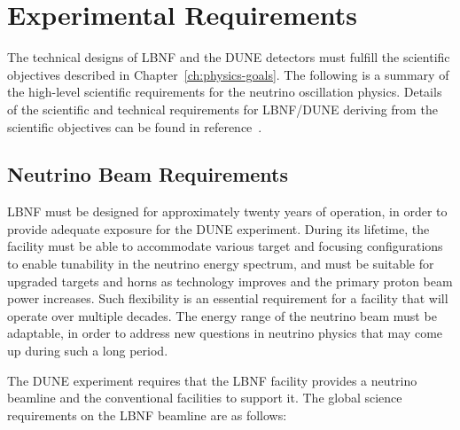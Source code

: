 \section{Experimental Requirements}
\label{sec:physics-lbnosc-det-req}

The technical designs of LBNF and the DUNE detectors must fulfill the
scientific objectives described in Chapter~\ref{ch:physics-goals}. The
following is a summary of the high-level scientific requirements for
the neutrino oscillation physics. Details of the scientific and technical 
requirements for LBNF/DUNE deriving from the scientific objectives can be found in reference~\cite{lbnfdune-cdr-req}.

\subsection{Neutrino Beam Requirements}
\label{sec:physics-lbnosc-beam-req}

LBNF must be designed for approximately twenty years of
operation, in order to provide adequate exposure for the DUNE
experiment. During its lifetime, the facility must be able to
accommodate various target and focusing configurations to enable
tunability in the neutrino energy spectrum, and must be suitable for
upgraded targets and horns as technology improves and the primary
proton beam power increases. Such flexibility is an essential
requirement for a facility that will operate over multiple
decades. The energy range of the neutrino beam must be adaptable, in
order to address new questions in neutrino physics that may come up
during such a long period.

The DUNE experiment requires that the LBNF facility provides a
neutrino beamline and the conventional facilities to support it. The
global science requirements on the LBNF beamline are as follows:

